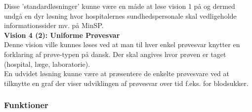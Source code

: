  Disse 'standardløsninger' kunne være en måde at løse vision 1 på og dermed undgå en dyr løsning hvor hospitalernes sundhedspersonale skal vedligeholde informationssider mv. på MinSP.\\
 \textbf{Vision 4 (2): Uniforme Prøvesvar} \\
 Denne vision ville kunnes løses ved at man til hver enkel prøvesvar knytter en forklaring af prøve-typen på dansk. Der skal angives hvor prøven er taget (hospital, læge, laboratorie).\\
 En udvidet løsning kunne være at præsentere de enkelte prøvesvare ved at tilknytte en graf der viser udviklingen af prøvesvar over tid f.eks. for blodsukker.\\
 \subsubsection{Funktioner}
